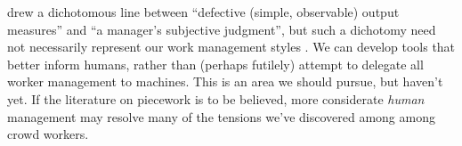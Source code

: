 \documentclass[trackingWork]{subfiles}
\begin{document}
\citeauthor{10.2307/2555446} drew a dichotomous line between
``defective (simple, observable) output measures'' and
``a manager's subjective judgment'',
but such a dichotomy need not necessarily represent our work management styles
\cite{10.2307/2555446}.
We can develop tools that better inform humans, rather than
(perhaps futilely) attempt to delegate all worker management to machines.
This is an area we should pursue, but haven't yet.
If the literature on piecework is to be believed,
more considerate \textit{human} management may resolve
many of the tensions we've discovered among among crowd workers.












\end{document}
